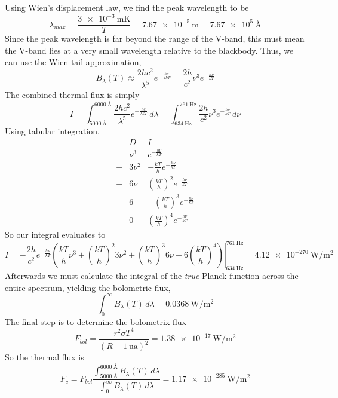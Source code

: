 \documentclass{article}
\begin{document}
Using Wien's displacement law, we find the peak wavelength to be
\begin{equation}
    \lambda_{max} = \frac{\SI{3e-3}{\meter\kelvin}}{T} = \SI{7.67e-5}{\meter} = \SI{7.67e+5}{\angstrom}
\end{equation}
Since the peak wavelength is far beyond the range of the V-band, this must mean the V-band lies at a very small wavelength relative to the blackbody.
Thus, we can use the Wien tail approximation,
\begin{equation}
    B_\lambda(T) \approx \frac{2hc^2}{\lambda^5} e^{-\frac{hc}{\lambda k T}} = \frac{2h}{c^2} \nu^3 e^{-\frac{h \nu}{k T}}
\end{equation}
The combined thermal flux is simply
\begin{equation}
    I = \int_{\SI{5000}{\angstrom}}^{\SI{6000}{\angstrom}} \frac{2hc^2}{\lambda^5} e^{-\frac{hc}{\lambda k T}} \, d\lambda = \int_{\SI{634}{\hertz}}^{\SI{761}{\hertz}} \frac{2h}{c^2} \nu^3 e^{-\frac{h \nu}{k T}} \, d\nu
\end{equation}
Using tabular integration,
\begin{equation}
    \begin{array}{c|c|c}
        & D & I \\
        \hline
        + & \nu^3 & e^{-\frac{h \nu}{k T}} \\
        - & 3\nu^2 & -\frac{k T}{h} e^{-\frac{h \nu}{k T}} \\
        + & 6\nu & \left(\frac{k T}{h}\right)^2 e^{-\frac{h \nu}{k T}} \\
        - & 6 & -\left(\frac{k T}{h}\right)^3 e^{-\frac{h \nu}{k T}} \\
        + & 0 & \left(\frac{k T}{h}\right)^4 e^{-\frac{h \nu}{k T}}
    \end{array}
\end{equation}
So our integral evaluates to
\begin{equation}
    I = \left.-\frac{2h}{c^2} e^{-\frac{h \nu}{k T}} \left(\frac{k T}{h} \nu^3 + \left(\frac{k T}{h}\right)^2 3\nu^2 + \left(\frac{k T}{h}\right)^3 6\nu + 6\left(\frac{k T}{h}\right)^4\right)\right|_{\SI{634}{\hertz}}^{\SI{761}{\hertz}} = \SI{4.12e-270}{\watt\per\meter\squared}
\end{equation}
Afterwards we must calculate the integral of the \emph{true} Planck function across the entire spectrum, yielding the bolometric flux,
\begin{equation}
    \int_0^\infty B_\lambda(T) \, d\lambda = \SI{0.0368}{\watt\per\meter\squared}
\end{equation}
The final step is to determine the bolometrix flux
\begin{equation}
    F_{bol} = \frac{r^2 \sigma T^4}{(R - \SI{1}{\astronomicalunit})^2} = \SI{1.38e-17}{\watt\per\meter\squared}
\end{equation}
So the thermal flux is
\begin{equation}
    F_c = F_{bol} \frac{\int_{\SI{5000}{\angstrom}}^{\SI{6000}{\angstrom}} B_\lambda(T) \, d\lambda}{\int_0^\infty B_\lambda(T) \, d\lambda} = \SI{1.17e-285}{\watt\per\meter\squared}
\end{equation}
\end{document}
